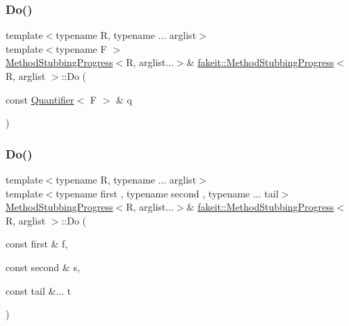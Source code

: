 \mbox{\label{structfakeit_1_1MethodStubbingProgress_a59f9d7ab7c86b809ce25b41d05b58ad2}} 
\subsubsection{\texorpdfstring{Do()}{Do()}\hspace{0.1cm}{\footnotesize\ttfamily [23/27]}}
{\footnotesize\ttfamily template$<$typename R, typename ... arglist$>$ \\
template$<$typename F $>$ \\
\mbox{\hyperlink{structfakeit_1_1MethodStubbingProgress}{Method\+Stubbing\+Progress}}$<$R, arglist...$>$\& \mbox{\hyperlink{structfakeit_1_1MethodStubbingProgress}{fakeit\+::\+Method\+Stubbing\+Progress}}$<$ R, arglist $>$\+::Do (\begin{DoxyParamCaption}\item[{const \mbox{\hyperlink{structfakeit_1_1Quantifier}{Quantifier}}$<$ F $>$ \&}]{q }\end{DoxyParamCaption})\hspace{0.3cm}{\ttfamily [inline]}}

\mbox{\label{structfakeit_1_1MethodStubbingProgress_a157561400e37da65c5b48f4466fc603c}} 
\subsubsection{\texorpdfstring{Do()}{Do()}\hspace{0.1cm}{\footnotesize\ttfamily [24/27]}}
{\footnotesize\ttfamily template$<$typename R, typename ... arglist$>$ \\
template$<$typename first , typename second , typename ... tail$>$ \\
\mbox{\hyperlink{structfakeit_1_1MethodStubbingProgress}{Method\+Stubbing\+Progress}}$<$R, arglist...$>$\& \mbox{\hyperlink{structfakeit_1_1MethodStubbingProgress}{fakeit\+::\+Method\+Stubbing\+Progress}}$<$ R, arglist $>$\+::Do (\begin{DoxyParamCaption}\item[{const first \&}]{f,  }\item[{const second \&}]{s,  }\item[{const tail \&...}]{t }\end{DoxyParamCaption})\hspace{0.3cm}{\ttfamily [inline]}}

